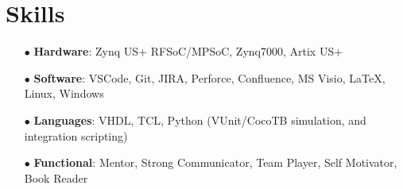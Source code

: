 \documentclass[10pt,final,sans]{resume}
\begin{document}
\section{Skills}
\begin{itemize}
  \item[$\bullet$] \textbf{Hardware}:  Zynq US+ RFSoC/MPSoC, Zynq7000, Artix US+ \\
  \item[$\bullet$] \textbf{Software}: VSCode, Git, JIRA, Perforce, Confluence, MS Visio, {\textrm \LaTeX}, Linux, Windows \\
  \item[$\bullet$] \textbf{Languages}: VHDL, TCL, Python (VUnit/CocoTB simulation, and integration scripting) \\
  \item[$\bullet$] \textbf{Functional}: Mentor, Strong Communicator, Team Player, Self Motivator, Book Reader \\
\end{itemize}

\vfill
\end{document}
